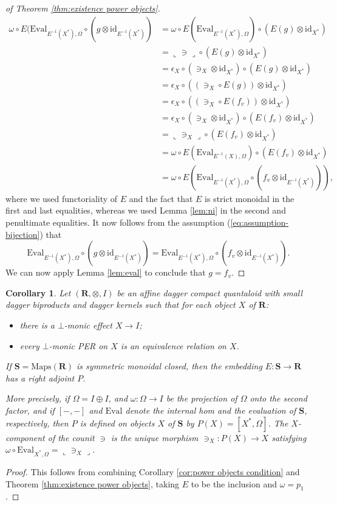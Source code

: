 \documentclass[12pt]{tac}
\newtheorem{corollary}[theorem]{Corollary}
\theoremstyle{definition}
\theoremstyle{remark}
\newcommand{\<}{\langle}
\renewcommand{\>}{\rangle}
\renewcommand{\:}{\colon}
\newcommand{\Eval}{\mathrm{Eval}}
\newcommand{\id}{\mathrm{id}}
\newcommand{\coname}[1]{\llcorner #1\lrcorner}
\begin{document}
\begin{proof}[of Theorem \ref{thm:existence power objects}]
\begin{align*}
    \omega\circ E(\Eval_{E^{-1}(X^*),\Omega}\circ (g\otimes \id_{E^{-1}(X^*)}) & = \omega\circ E(\Eval_{E^{-1}(X^*),\Omega})\circ (E(g)\otimes \id_{X^*}) \\
    & = \coname{\ni}\circ (E(g)\otimes\id_{X^*})\\
    & = \epsilon_X\circ (\ni_X\otimes \id_{X^*})\circ (E(g)\otimes \id_{X^*})\\
    & = \epsilon_X\circ ((\ni_X\circ E(g))\otimes \id_{X^*})\\
      & = \epsilon_X\circ ((\ni_X\circ E(f_v))\otimes \id_{X^*})\\
          & = \epsilon_X\circ (\ni_X\otimes \id_{X^*})\circ (E(f_v)\otimes \id_{X^*})\\
          & = \coname{\ni_X}\circ (E(f_v)\otimes\id_{X^*})\\
          & = \omega\circ E(\Eval_{E^{-1}(X),\Omega})\circ (E(f_v)\otimes \id_{X^*}) \\
            & = \omega\circ E(\Eval_{E^{-1}(X^*),\Omega}\circ (f_v\otimes
            \id_{E^{-1}(X^*)})),
\end{align*}
where we used functoriality of $E$ and the fact that $E$ is strict monoidal in the first and last equalities, whereas we used Lemma \ref{lem:ni} in the second and penultimate equalities. It now follows from the assumption (\ref{eq:assumption-bijection}) that
\[ \Eval_{E^{-1}(X^*),\Omega}\circ (g\otimes \id_{E^{-1}(X^*)})=\Eval_{E^{-1}(X^*),\Omega}\circ (f_v\otimes \id_{E^{-1}(X^*)}).\]
We can now apply Lemma \ref{lem:eval} to conclude that $g=f_v$.
\end{proof}


\begin{corollary}\label{cor:power objects}
    Let $(\mathbf R,\otimes,I)$ be an affine dagger compact quantaloid with small dagger biproducts and dagger kernels such that for each object $X$ of $\mathbf R$:
    \begin{itemize}
        \item[(1)] there is a $\bot$-monic effect $X\to I$;
        \item[(2)] every $\bot$-monic PER on $X$ is an equivalence relation on $X$.
    \end{itemize}
    If $\mathbf S=\mathrm{Maps}(\mathbf R)$ is symmetric monoidal closed, then the embedding $E:\mathbf S\to\mathbf R$ has a right adjoint $P$.

    More precisely, if $\Omega=I\oplus I$, and $\omega:\Omega\to I$ be the projection of $\Omega$ onto the second factor, and if $[-,-]$ and $\Eval$ denote the internal hom and the evaluation of $\mathbf S$, respectively, then $P$ is defined on objects $X$ of $\mathbf S$  by $P(X)=[X^*,\Omega]$. The $X$-component of the counit $\ni$ is the unique morphism $\ni_X:P(X)\to X$ satisfying $\omega\circ\Eval_{X^*,\Omega}=\coname{\ni_X}$.
\end{corollary}
\begin{proof}
    This follows from combining Corollary \ref{cor:power objects condition} and Theorem \ref{thm:existence power objects}, taking $E$ to be the inclusion and $\omega=p_1$. 
\end{proof}
\end{document}
